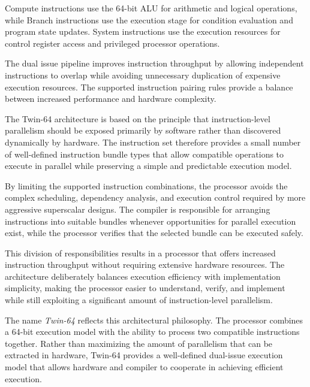 Compute instructions use the 64-bit ALU for arithmetic and logical operations, while Branch instructions use the execution stage for condition evaluation and program state updates. System instructions use the execution resources for control register access and privileged processor operations.

The dual issue pipeline improves instruction throughput by allowing independent instructions to overlap while avoiding unnecessary duplication of expensive execution resources. The supported instruction pairing rules provide a balance between increased performance and hardware complexity.


The Twin-64 architecture is based on the principle that instruction-level parallelism should be exposed primarily by software rather than discovered dynamically by hardware. The instruction set therefore provides a small number of well-defined instruction bundle types that allow compatible operations to execute in parallel while preserving a simple and predictable execution model.

By limiting the supported instruction combinations, the processor avoids the complex scheduling, dependency analysis, and execution control required by more aggressive superscalar designs. The compiler is responsible for arranging instructions into suitable bundles whenever opportunities for parallel execution exist, while the processor verifies that the selected bundle can be executed safely.

This division of responsibilities results in a processor that offers increased instruction throughput without requiring extensive hardware resources. The architecture deliberately balances execution efficiency with implementation simplicity, making the processor easier to understand, verify, and implement while still exploiting a significant amount of instruction-level parallelism.

The name \emph{Twin-64} reflects this architectural philosophy. The processor combines a 64-bit execution model with the ability to process two compatible instructions together. Rather than maximizing the amount of parallelism that can be extracted in hardware, Twin-64 provides a well-defined dual-issue execution model that allows hardware and compiler to cooperate in achieving efficient execution.
 
